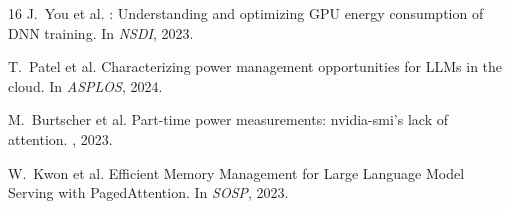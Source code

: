 \documentclass[sigconf,anonymous,review]{acmart}
\begin{document}
\begin{thebibliography}{16}
J.~You et al.
: Understanding and optimizing GPU energy consumption of DNN training.
\newblock In {\em NSDI}, 2023.

T.~Patel et al.
\newblock Characterizing power management opportunities for LLMs in the cloud.
\newblock In {\em ASPLOS}, 2024.

M.~Burtscher et al.
\newblock Part-time power measurements: nvidia-smi's lack of attention.
, 2023.

W.~Kwon et al.
\newblock Efficient Memory Management for Large Language Model Serving with {PagedAttention}.
\newblock In {\em SOSP}, 2023.

\end{thebibliography}
\end{document}

